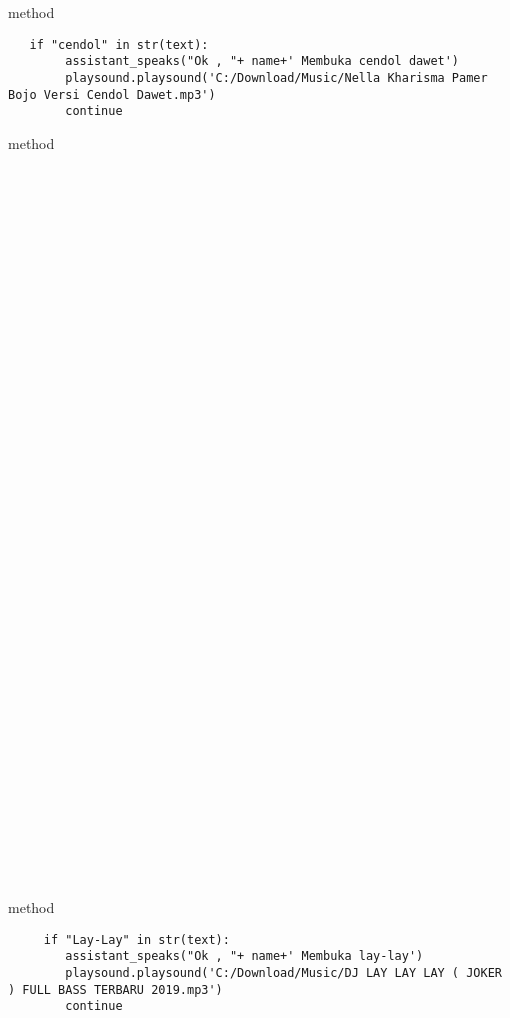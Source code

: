 \\
\\
\\
\\
\\
\\
\\
\\
\\
\\
 method 
\begin{lstlisting}
   if "cendol" in str(text):
        assistant_speaks("Ok , "+ name+' Membuka cendol dawet')
        playsound.playsound('C:/Download/Music/Nella Kharisma Pamer Bojo Versi Cendol Dawet.mp3')
        continue
\end{lstlisting}
 method 
\\
\\
\\
\\
\\
\\
\\
\\
\\
\\
\\
\\
\\
\\
\\
\\
\\
\\
\\
\\
\\
\\
\\
\\
\\
\\
\\
\\
\\
\\
\\
\\
\\
\\
\\
\\
\\
\\
\\
 method 
 \begin{lstlisting}
     if "Lay-Lay" in str(text):
        assistant_speaks("Ok , "+ name+' Membuka lay-lay')
        playsound.playsound('C:/Download/Music/DJ LAY LAY LAY ( JOKER ) FULL BASS TERBARU 2019.mp3')
        continue
 \end{lstlisting}
